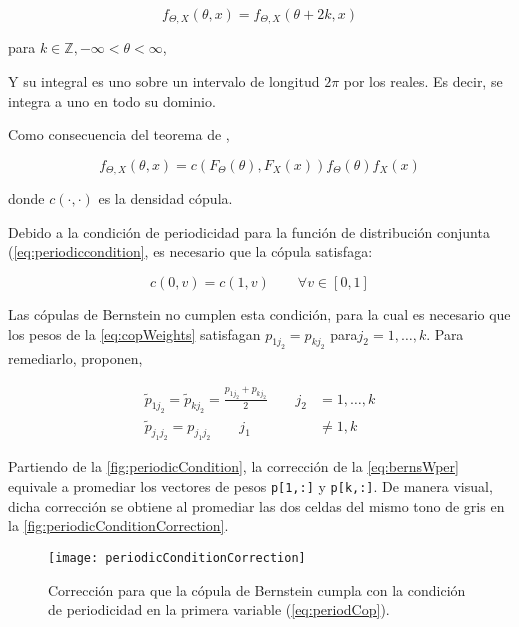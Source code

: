 \begin{equation}
	f_{\Theta,X}\left( \theta,x \right) = f_{\Theta,X}\left( \theta + 2k,x \right)
	\label{eq:periodiccondition}
\end{equation}

\noindent
para \(k \in \mathbb{Z}, -\infty < \theta < \infty\),

Y su integral es uno sobre un intervalo de longitud \(2\pi\) por los reales. Es decir, se integra a uno en todo su dominio.

Como consecuencia del teorema de \cite{sklar_fonctions_1959},

$$f_{\Theta,X}\left( \theta,x \right) = c\left( F_{\Theta}\left( \theta \right),F_{X}\left( x \right) \right)f_{\Theta}\left( \theta \right)f_{X}\left( x \right)$$

\noindent
donde \(c\left( \cdot , \cdot \right)\) es la densidad c\'opula.

Debido a la condici\'on de periodicidad para la funci\'on de distribuci\'on conjunta (\autoref{eq:periodiccondition}, es necesario que la c\'opula satisfaga:

\begin{equation}
	c\left( 0,v \right) = c\left( 1,v \right) \qquad \forall v \in [0,1]
	\label{eq:periodCop}
\end{equation}

Las c\'opulas de Bernstein no cumplen esta condici\'on, para la cual es necesario que los pesos de la \autoref{eq:copWeights}  satisfagan \(p_{1j_{2}} = p_{kj_{2}}\) para\(j_{2} = 1,\ldots,k\). Para remediarlo, \citet{carnicero_non-parametric_2013} proponen,

\begin{align}
	\tilde{p}_{1j_{2}} = {\tilde{p}}_{kj_{2}} = \frac{p_{1j_{2}} + p_{kj_{2}}}{2}  \qquad j_{2} &= 1,\ldots,k \label{eq:bernsWper}\\
	{\tilde{p}}_{j_{1}j_{2}} = p_{j_{1}j_{2}} \qquad j_{1} &\neq 1,k
\end{align}

Partiendo de la \autoref{fig:periodicCondition}, la correcci\'on de la \autoref{eq:bernsWper} equivale a promediar los vectores de pesos \verb|p[1,:]| y \verb|p[k,:]|. De manera visual, dicha correcci\'on se obtiene al promediar las dos celdas del mismo tono de gris en la \autoref{fig:periodicConditionCorrection}.

\begin{figure}
	\centering
	\texttt{[image: periodicConditionCorrection]}
	\caption{Correcci\'on para que la c\'opula de Bernstein cumpla con la condici\'on de periodicidad en la primera variable (\autoref{eq:periodCop}).}
	\label{fig:periodicConditionCorrection}
\end{figure}

